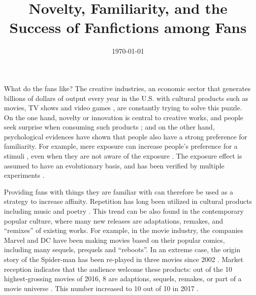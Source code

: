 \documentclass[a4paper]{article}
\begin{document}

\title{Novelty, Familiarity, and the Success of Fanfictions among Fans} %
\date{\today}
\maketitle %

What do the fans like? The creative industries, an economic sector that generates billions of dollars of output every year in the U.S. with cultural products such as movies, TV shows and video games \cite{creativeindustries}, are constantly trying to solve this puzzle. On the one hand, novelty or innovation is central to creative works, and people seek surprise when consuming such products \cite{hutter2011infinite}; and on the other hand, psychological evidences have shown that people also have a strong preference for familiarity. For example, mere exposure can increase people's preference for a stimuli \cite{zajonc1968attitudinal}, even when they are not aware of the exposure \cite{kunst1980affective}. The exposure effect is assumed to have an evolutionary basis, and has been verified by multiple experiments \cite{bornstein1989exposure}.

Providing fans with things they are familiar with can therefore be used as a strategy to increase affinity. Repetition has long been utilized in cultural products including music and poetry \cite{huron2013psychological}. This trend can be also found in the contemporary popular culture, where many new releases are adaptations, remakes, and ``remixes'' \cite{manovich2007comes} of existing works. For example, in the movie industry, the companies Marvel and DC have been making movies based on their popular comics, including many sequels, prequels and ``reboots''. In an extreme case, the origin story of the Spider-man has been re-played in three movies since 2002 \cite{spiderman}. Market reception indicates that the audience welcome these products: out of the 10 highest-grossing movies of 2016, 8 are adaptions, sequels, remakes, or part of a movie universe \cite{2016film}. This number increased to 10 out of 10 in 2017 \cite{2017film}. 
\end{document}
